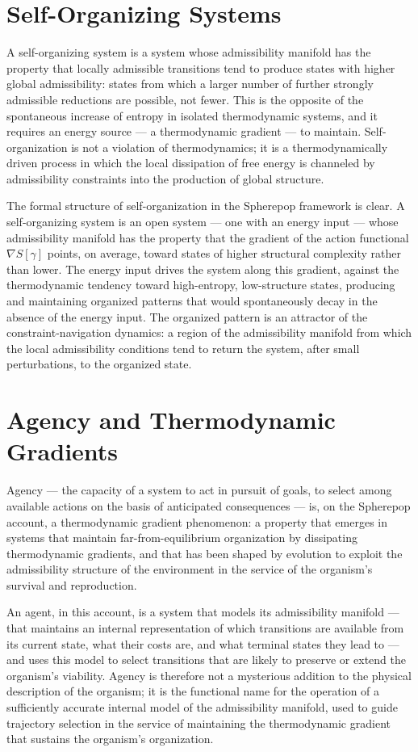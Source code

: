 \documentclass[12pt,openany]{book}
\theoremstyle{plain}
\theoremstyle{definition}
\theoremstyle{remark}
\begin{document}
\section{Self-Organizing Systems}

A self-organizing system is a system whose admissibility manifold has the property that locally admissible transitions tend to produce states with higher global admissibility: states from which a larger number of further strongly admissible reductions are possible, not fewer. This is the opposite of the spontaneous increase of entropy in isolated thermodynamic systems, and it requires an energy source — a thermodynamic gradient — to maintain. Self-organization is not a violation of thermodynamics; it is a thermodynamically driven process in which the local dissipation of free energy is channeled by admissibility constraints into the production of global structure.

The formal structure of self-organization in the Spherepop framework is clear. A self-organizing system is an open system — one with an energy input — whose admissibility manifold has the property that the gradient of the action functional $\nabla S[\gamma]$ points, on average, toward states of higher structural complexity rather than lower. The energy input drives the system along this gradient, against the thermodynamic tendency toward high-entropy, low-structure states, producing and maintaining organized patterns that would spontaneously decay in the absence of the energy input. The organized pattern is an attractor of the constraint-navigation dynamics: a region of the admissibility manifold from which the local admissibility conditions tend to return the system, after small perturbations, to the organized state.

\section{Agency and Thermodynamic Gradients}

Agency — the capacity of a system to act in pursuit of goals, to select among available actions on the basis of anticipated consequences — is, on the Spherepop account, a thermodynamic gradient phenomenon: a property that emerges in systems that maintain far-from-equilibrium organization by dissipating thermodynamic gradients, and that has been shaped by evolution to exploit the admissibility structure of the environment in the service of the organism's survival and reproduction.

An agent, in this account, is a system that models its admissibility manifold — that maintains an internal representation of which transitions are available from its current state, what their costs are, and what terminal states they lead to — and uses this model to select transitions that are likely to preserve or extend the organism's viability. Agency is therefore not a mysterious addition to the physical description of the organism; it is the functional name for the operation of a sufficiently accurate internal model of the admissibility manifold, used to guide trajectory selection in the service of maintaining the thermodynamic gradient that sustains the organism's organization.
\end{document}
